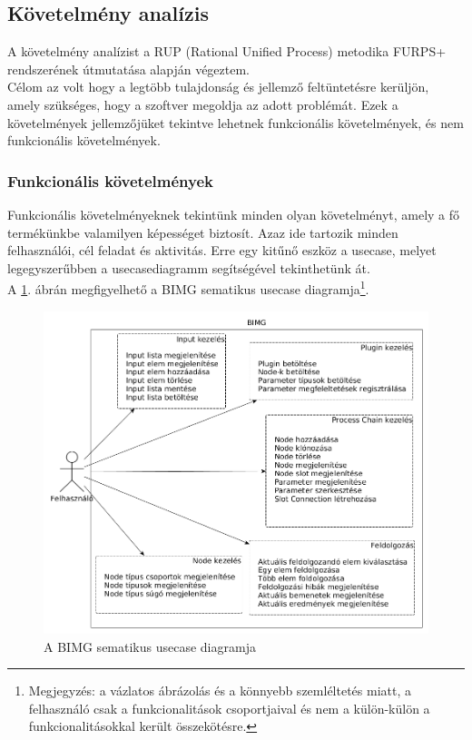 \documentclass[a4paper,12pt,oneside]{report}
\begin{document}
\subsection{Követelmény analízis}
A követelmény analízist a RUP (Rational Unified Process) metodika FURPS+ rendszerének útmutatása alapján végeztem. \\Célom az volt hogy a legtöbb tulajdonság és jellemző feltüntetésre kerüljön, amely szükséges, hogy a szoftver megoldja az adott problémát. \cite{website:soft_req_def} Ezek a követelmények jellemzőjüket tekintve lehetnek funkcionális követelmények, és nem funkcionális követelmények.

\subsubsection{Funkcionális követelmények}
Funkcionális követelményeknek tekintünk minden olyan követelményt, amely a fő termékünkbe valamilyen képességet biztosít. \cite{website:soft_func_req_ibm} Azaz ide tartozik minden felhasználói, cél feladat és aktivitás. Erre egy kitűnő eszköz a usecase, melyet legegyszerűbben a usecasediagramm segítségével tekinthetünk át.
\\
A \ref{fig:bimg_usecase_schema}. ábrán megfigyelhető a BIMG sematikus usecase diagramja\footnote{Megjegyzés: a vázlatos ábrázolás és a könnyebb szemléltetés miatt, a felhasználó csak a funkcionalitások csoportjaival és nem a külön-külön a funkcionalitásokkal került összekötésre.}.
\begin{figure}[h]
  \includegraphics[width=\textwidth]{schematic_usecase.png}
  \caption{A BIMG sematikus usecase diagramja }
  \label{fig:bimg_usecase_schema}
\end{figure}
\end{document}
